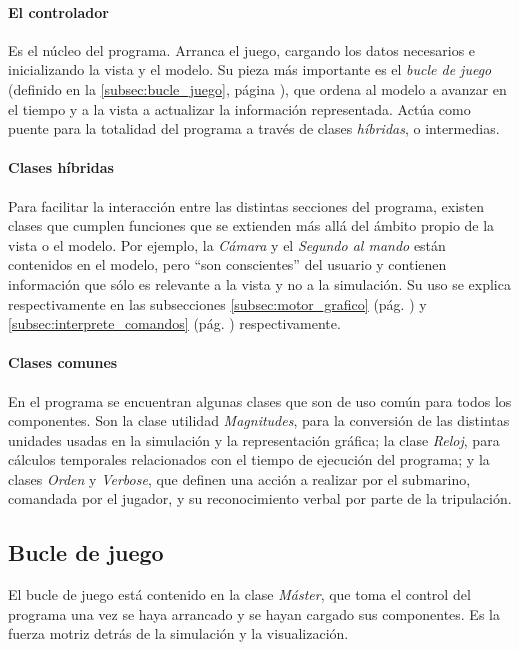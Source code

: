 \documentclass[a4paper,
	11pt,
	parskip=full,
	bibliography=totoc,
	twoside
	]{scrartcl}
\begin{document}
		\paragraph{El controlador}
			Es el núcleo del programa. Arranca el juego, cargando los datos necesarios e inicializando la vista y el modelo. Su pieza más importante es el \textit{bucle de juego} (definido en la \autoref{subsec:bucle_juego}, página \pageref{subsec:bucle_juego}), que ordena al modelo a avanzar en el tiempo y a la vista a actualizar la información representada. Actúa como puente para la totalidad del programa a través de clases \textit{híbridas}, o intermedias.
			
		\paragraph{Clases híbridas}
			Para facilitar la interacción entre las distintas secciones del programa, existen clases que cumplen funciones que se extienden más allá del ámbito propio de la vista o el modelo. Por ejemplo, la \textit{Cámara} y el \textit{Segundo al mando} están contenidos en el modelo, pero ``son conscientes'' del usuario y contienen información que sólo es relevante a la vista y no a la simulación.  Su uso se explica respectivamente en las subsecciones \ref{subsec:motor_grafico}  (pág. \pageref{subsec:motor_grafico}) y \ref{subsec:interprete_comandos}  (pág. \pageref{subsec:interprete_comandos}) respectivamente.
			
		\paragraph{Clases comunes}
			En el programa se encuentran algunas clases que son de uso común para todos los componentes. Son la clase utilidad \textit{Magnitudes}, para la conversión de las distintas unidades usadas en la simulación y la representación gráfica; la clase \textit{Reloj}, para cálculos temporales relacionados con el tiempo de ejecución del programa; y la clases \textit{Orden} y \textit{Verbose}, que definen una acción a realizar por el submarino, comandada por el jugador, y su reconocimiento verbal por parte de la tripulación.
			
	\subsection{Bucle de juego}
	\label{subsec:bucle_juego}
		El bucle de juego está contenido en la clase \textit{Máster}, que toma el control del programa una vez se haya arrancado y se hayan cargado sus componentes. Es la fuerza motriz detrás de la simulación y la visualización. \cite{dewitters_game_loop, so_game_loop}
		
\end{document}
